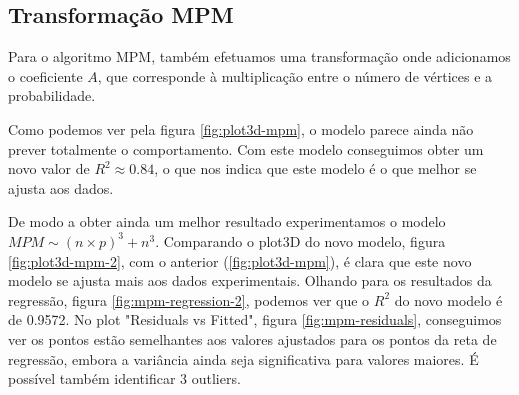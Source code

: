 \documentclass{uofa-eng-assignment}
\begin{document}
\subsection{Transformação MPM}

Para o algoritmo MPM, também efetuamos uma transformação onde adicionamos o coeficiente $A$, que corresponde à multiplicação entre o número de vértices e a probabilidade.

Como podemos ver pela figura \ref{fig:plot3d-mpm}, o modelo parece ainda não prever totalmente o comportamento. Com este modelo conseguimos obter um novo valor de $R^2\approx0.84$, o que nos indica que este modelo é o que melhor se ajusta aos dados.

De modo a obter ainda um melhor resultado experimentamos o modelo $MPM \sim (n \times p)^3 + n^3$. Comparando o plot3D do novo modelo, figura \ref{fig:plot3d-mpm-2}, com o anterior (\ref{fig:plot3d-mpm}), é clara que este novo modelo se ajusta mais aos dados experimentais. Olhando para os resultados da regressão, figura \ref{fig:mpm-regression-2}, podemos ver que o $R^2$ do novo modelo é de 0.9572.
No plot "Residuals vs Fitted", figura \ref{fig:mpm-residuals}, conseguimos ver os pontos estão semelhantes aos valores ajustados para os pontos da reta de regressão, embora a variância ainda seja significativa para valores maiores. É possível também identificar 3 outliers.
\end{document}
